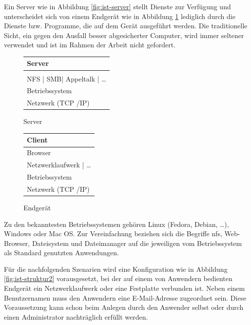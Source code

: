 \documentclass[oneside, ngerman, toc=bibliography,bibliography=totoc,listof=entryprefix, open=right,numbers=noenddot,fontsize=12pt]{scrbook}
\begin{document}
 Ein Server wie in Abbildung \ref{fig:ist-server} stellt Dienste zur Verfügung und unterscheidet sich von einem Endgerät wie in Abbildung \ref{fig:ist-endgeraet} lediglich durch die Dienste bzw. Programme, die auf dem Gerät ausgeführt werden. Die traditionelle Sicht, ein gegen den Ausfall besser abgesicherter Computer, wird immer seltener verwendet und ist im Rahmen der Arbeit nicht gefordert.
 
\begin{figure}[htbp] 
	\centering 
	\begin{minipage}{.5\textwidth}
	\begin{tabular}{|p{}|}
		\hline
Server\\ \hline\hline
\\
NFS | SMB| Appeltalk | \ldots \\ \hline
Betriebssystem \\ \hline
Netzwerk (TCP /IP) \\ \hline
	\end{tabular}
	 
	\caption{Server}
	\label{fig:ist-server}
\end{minipage}%
\begin{minipage}{.5\textwidth}
	\begin{tabular}{|p{}|}
 		\hline
		Client \\\hline\hline
		Browser \\ \hline
		Netzwerklaufwerk | \ldots \\ \hline
		Betriebssystem \\ \hline
		Netzwerk (TCP /IP) \\ \hline
	\end{tabular}
	\caption{Endgerät}
	\label{fig:ist-endgeraet}
\end{minipage}%
\end{figure}   

Zu den bekanntesten Betriebssystemen gehören Linux (Fedora, Debian, \ldots), Windows oder Mac OS. Zur Vereinfachung beziehen sich die Begriffe  \acrshort{nfs}, Web-Browser, Dateisystem und Dateimanager auf die jeweiligen vom Betriebssystem als Standard genutzten Anwendungen.

Für die nachfolgenden Szenarien wird eine Konfiguration wie in Abbildung \ref{fig:ist-struktur2} vorausgesetzt, bei der auf einem von Anwendern bedienten Endgerät ein Netzwerklaufwerk oder eine Festplatte verbunden ist. Neben einem Benutzernamen muss den Anwendern eine E-Mail-Adresse zugeordnet sein. Diese Voraussetzung kann schon beim Anlegen durch den Anwender selbst oder durch einen Administrator nachträglich erfüllt werden.
\end{document}
